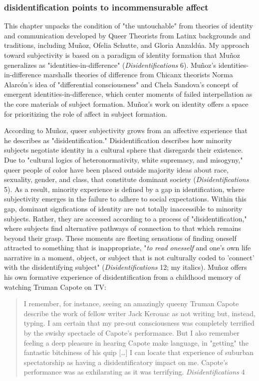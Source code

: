\documentclass[11pt]{article}
\begin{document}
\subsubsection{disidentification points to incommensurable affect}
\label{sec:org1ea07fa}
This chapter unpacks the condition of "the untouchable" from theories
of identity and communication developed by Queer Theorists from Latinx
backgrounds and traditions, including Muñoz, Ofelia Schutte, and
Gloria Anzaldúa. My approach toward subjectivity is based on a
paradigm of identity formation that Muñoz generalizes as
"identities-in-difference" (\emph{Disidentifications} 6). Muñoz's
identities-in-difference marshalls theories of difference from Chicanx
theorists Norma Alarcón's idea of "differential consciousness" and
Chela Sandova's concept of emergent identities-in-difference, which
center moments of failed interpellation as the core materials of
subject formation. Muñoz's work on identity offers a space for
prioritizing the role of affect in subject formation.

According to Muñoz, queer subjectivity grows from an affective
experience that he describes as "disidentification." Disidentification
describes how minority subjects negotiate identity in a cultural
sphere that disregards their existence. Due to "cultural logics of
heteronormativity, white supremacy, and misogyny," queer people of
color have been placed outside majority ideas about race, sexuality,
gender, and class, that constitute dominant society
(\emph{Disidentifications} 5). As a result, minority experience is defined
by a gap in identification, where subjectivity emerges in the failure
to adhere to social expectations. Within this gap, dominant
signfications of identity are not totally inaccessible to minority
subjects. Rather, they are accessed according to a process of
"disidentification," where subjects find alternative pathways of
connection to that which remains beyond their grasp. These moments are
fleeting sensations of finding oneself attracted to something that is
inappropriate, "\emph{to read onesself} and one's own life narrative in a
moment, object, or subject that is not culturally coded to 'connect'
with the disidentifying subject" (\emph{Disidentifications} 12; my
italics). Muñoz offers his own formative experience of
disidentification from a childhood memory of watching Truman Capote on
TV:

\begin{quote}
I remember, for instance, seeing an amazingly queeny Truman Capote
describe the work of fellow writer Jack Kerouac as not writing but,
instead, typing. I am certain that my pre-out consciousness was
completely terrified by the swishy spectacle of Capote's
performance. But I also remember feeling a deep pleasure in hearing
Capote make language, in "getting" the fantastic bitchiness of his
quip [\ldots{}] I can locate that experience of suburban spectatorship as
having a disidentificatory impact on me. Capote's performance was as
exhilarating as it was terrifying. \emph{Disidentifications} 4
\end{quote}
\end{document}
